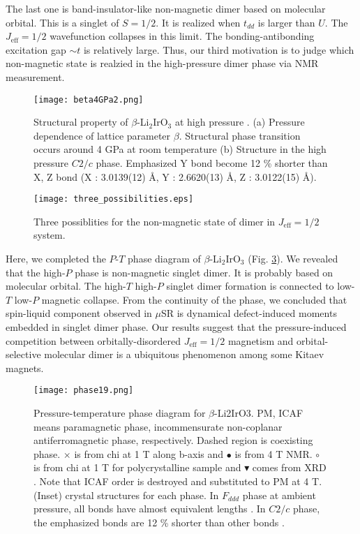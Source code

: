\documentclass[a4,10.5pt]{report}
\begin{document}
The last one is band-insulator-like non-magnetic dimer based on molecular orbital.
This is a singlet of $S = 1/2$.
It is realized when $t_{dd}$ is larger than $U$.
The $J_{\mathrm{eff}} = 1/2$ wavefunction collapses in this limit.
The bonding-antibonding excitation gap $\sim t$ is relatively large.
Thus, our third motivation is to judge which non-magnetic state is realzied in the high-pressure dimer phase via NMR measurement.

\begin{figure}
  \centering
  \texttt{[image: beta4GPa2.png]}
  \caption{Structural property of $\beta$-Li$_2$IrO$_3$ at high pressure \cite{veiga2017pressure}.
  (a) Pressure dependence of lattice parameter $\beta$.
  Structural phase transition occurs around 4 GPa at room temperature
  (b) Structure in the high pressure $C2/c$ phase.
  Emphasized Y bond become 12 \% shorter than X, Z bond (X : 3.0139(12) \AA, Y : 2.6620(13) \AA, Z : 3.0122(15) \AA). }
  \label{beta4GPa}
\end{figure}

\begin{figure}
  \centering
  \texttt{[image: three\_possibilities.eps]}
  \caption{Three possiblities for the non-magnetic state of dimer in $J_{\mathrm{eff}} = 1/2$ system.}
  \label{three}
\end{figure}

Here, we completed the $P$-$T$ phase diagram of $\beta$-Li$_2$IrO$_3$ (Fig. \ref{phase_pre}). 
We revealed that the high-$P$ phase is non-magnetic singlet dimer. 
It is probably based on molecular orbital. 
The high-$T$ high-$P$ singlet dimer formation is connected to low-$T$ low-$P$ magnetic collapse. 
From the continuity of the phase, we concluded that spin-liquid component observed in $\mu$SR is dynamical defect-induced moments embedded in singlet dimer phase. 
Our results suggest that the pressure-induced competition between orbitally-disordered $J_{\mathrm{eff}} = 1/2$ magnetism and orbital-selective molecular dimer 
is a ubiquitous phenomenon among some Kitaev magnets.

\begin{figure}[h]
  \centering
  \texttt{[image: phase19.png]}
  \caption{Pressure-temperature phase diagram for $\beta$-Li2IrO3. 
  PM, ICAF means paramagnetic phase, incommensurate non-coplanar antiferromagnetic phase, respectively. 
  Dashed region is coexisting phase. 
  $\times$ is from chi at 1 T along b-axis and $\bullet$ is from 4 T NMR. 
  $\circ$ is from chi at 1 T for polycrystalline sample \cite{Majumder2018} and $\blacktriangledown$ comes from XRD \cite{veiga2017pressure}. 
  Note that ICAF order is destroyed and substituted to PM at 4 T. (Inset) crystal structures for each phase. 
  In $F_{ddd}$ phase at ambient pressure, all bonds have almost equivalent lengths \cite{takayama2015hyperhoneycomb}. 
  In $C2/c$ phase, the emphasized bonds are 12 \% shorter than other bonds \cite{veiga2017pressure}.}
  \label{phase_pre}
\end{figure}
\end{document}
